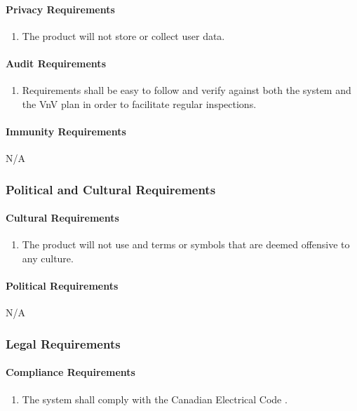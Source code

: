 \documentclass[12pt]{article}
\begin{document}
{\paragraph{Privacy Requirements}
\begin{enumerate}[{SR}1., leftmargin=2\parindent, resume]
    \item The product will not store or collect user data.
\end{enumerate}

\paragraph{Audit Requirements}
\begin{enumerate}[{SR}1., leftmargin=2\parindent, resume]
    \item Requirements shall be easy to follow and verify against both the system and the VnV plan in order to facilitate regular inspections.
\end{enumerate}

\paragraph{Immunity Requirements}
N/A



\subsubsection{Political and Cultural Requirements}
\label{NFR_PC}
\paragraph{Cultural Requirements}
\begin{enumerate}[{PC}1., leftmargin=2\parindent]
    \item The product will not use and terms or symbols that are deemed offensive to any culture.
\end{enumerate}

\paragraph{Political Requirements}
N/A



\subsubsection{Legal Requirements}
\label{NFR_Legal}
\paragraph{Compliance Requirements}
\begin{enumerate}[{LR}1., leftmargin=2\parindent]
    \item The system shall comply with the Canadian Electrical Code \cite{CanadianElectricalCode2021}.
\end{enumerate}

}
\end{document}
